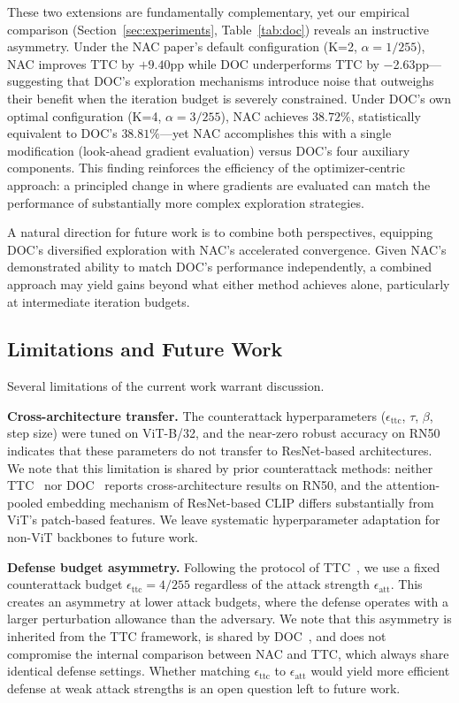 \documentclass[pdflatex,sn-basic,Numbered]{sn-jnl}
\theoremstyle{thmstyleone}
\theoremstyle{thmstyletwo}
\theoremstyle{thmstylethree}
\begin{document}
These two extensions are fundamentally complementary, yet our empirical comparison (Section~\ref{sec:experiments}, Table~\ref{tab:doc}) reveals an instructive asymmetry. Under the NAC paper's default configuration (K=2, $\alpha=1/255$), NAC improves TTC by $+9.40$pp while DOC underperforms TTC by $-$2.63pp---suggesting that DOC's exploration mechanisms introduce noise that outweighs their benefit when the iteration budget is severely constrained. Under DOC's own optimal configuration (K=4, $\alpha=3/255$), NAC achieves $38.72\%$, statistically equivalent to DOC's $38.81\%$---yet NAC accomplishes this with a single modification (look-ahead gradient evaluation) versus DOC's four auxiliary components. This finding reinforces the efficiency of the optimizer-centric approach: a principled change in where gradients are evaluated can match the performance of substantially more complex exploration strategies.

A natural direction for future work is to combine both perspectives, equipping DOC's diversified exploration with NAC's accelerated convergence. Given NAC's demonstrated ability to match DOC's performance independently, a combined approach may yield gains beyond what either method achieves alone, particularly at intermediate iteration budgets.

\subsection{Limitations and Future Work}

Several limitations of the current work warrant discussion.

\textbf{Cross-architecture transfer.} The counterattack hyperparameters ($\epsilon_{\text{ttc}}$, $\tau$, $\beta$, step size) were tuned on ViT-B/32, and the near-zero robust accuracy on RN50 indicates that these parameters do not transfer to ResNet-based architectures. We note that this limitation is shared by prior counterattack methods: neither TTC~\cite{xing2025clip} nor DOC~\cite{jiang2026diversifying} reports cross-architecture results on RN50, and the attention-pooled embedding mechanism of ResNet-based CLIP differs substantially from ViT's patch-based features. We leave systematic hyperparameter adaptation for non-ViT backbones to future work.

\textbf{Defense budget asymmetry.} Following the protocol of TTC~\cite{xing2025clip}, we use a fixed counterattack budget $\epsilon_{\text{ttc}}=4/255$ regardless of the attack strength $\epsilon_{\text{att}}$. This creates an asymmetry at lower attack budgets, where the defense operates with a larger perturbation allowance than the adversary. We note that this asymmetry is inherited from the TTC framework, is shared by DOC~\cite{jiang2026diversifying}, and does not compromise the internal comparison between NAC and TTC, which always share identical defense settings. Whether matching $\epsilon_{\text{ttc}}$ to $\epsilon_{\text{att}}$ would yield more efficient defense at weak attack strengths is an open question left to future work.
\end{document}
